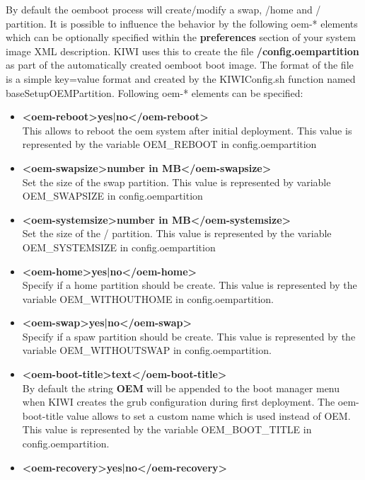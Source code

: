 By default the oemboot process will create/modify a swap, /home and /
partition. It is possible to influence the behavior by the following
oem-* elements which can be optionally specified within the
\textbf{preferences} section of your system image XML description.
KIWI uses this to create the file \textbf{/config.oempartition} as part
of the automatically created oemboot boot image. The format of the
file is a simple key=value format and created by the KIWIConfig.sh
function named baseSetupOEMPartition. Following oem-* elements can
be specified:

\begin{itemize}
\item \textbf{<oem-reboot>yes|no</oem-reboot>}\\
      This allows to reboot the oem system after initial deployment.
      This value is represented by the variable OEM\_REBOOT in
      config.oempartition
\item \textbf{<oem-swapsize>number in MB</oem-swapsize>}\\
      Set the size of the swap partition. This value is represented by
      variable OEM\_SWAPSIZE in config.oempartition
\item \textbf{<oem-systemsize>number in MB</oem-systemsize>}\\
      Set the size of the / partition. This value is represented by the
      variable OEM\_SYSTEMSIZE in config.oempartition
\item \textbf{<oem-home>yes|no</oem-home>}\\
      Specify if a home partition should be create. This value is represented
      by the variable OEM\_WITHOUTHOME in config.oempartition.
\item \textbf{<oem-swap>yes|no</oem-swap>}\\
      Specify if a spaw partition should be create. This value is represented 
      by the variable OEM\_WITHOUTSWAP in config.oempartition.
\item \textbf{<oem-boot-title>text</oem-boot-title>}\\
      By default the string \textbf{OEM} will be appended to the
      boot manager menu when KIWI creates the grub configuration during
      first deployment. The oem-boot-title value allows to set a custom
      name which is used instead of OEM. This value is represented
      by the variable OEM\_BOOT\_TITLE in config.oempartition.
\item \textbf{<oem-recovery>yes|no</oem-recovery>}\\

\end{itemize}
